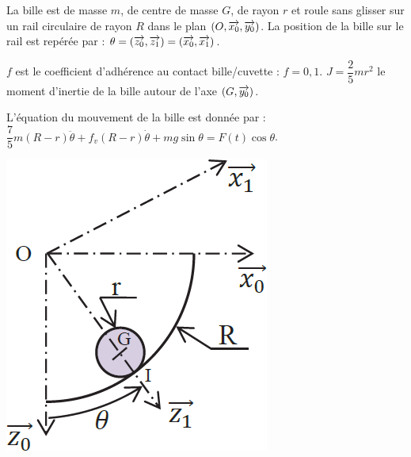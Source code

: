 \documentclass[10pt,fleqn]{article} %
\begin{document}
\noindent\begin{minipage}[c]{.7\linewidth}

La bille  est de masse $m$, de centre de masse $G$, de rayon $r$ et 
roule sans glisser sur un rail circulaire de rayon $R$ dans
le plan $\left( O, \overrightarrow{x_0}, \overrightarrow{y_0}\right)$. La position de la bille sur le rail est repérée par :
$\theta=\left(\overrightarrow{z_0},\overrightarrow{z_1}\right)=\left(\overrightarrow{x_0},\overrightarrow{x_1}\right)$.

$f$ est le coefficient d’adhérence au contact bille/cuvette : $f=0,1$. $J=\dfrac{2}{5}mr^2$ le moment d'inertie de la bille autour de l'axe $\left(G,\overrightarrow{{y_0}}\right)$.



L'équation du mouvement de la bille est donnée par :
 $\dfrac{7}{5} m\left(R-r \right)\ddot{\theta} + f_v \left(R-r \right)\dot{\theta} + mg \sin \theta = F(t) \cos \theta$.%


\end{minipage} \hfill
\begin{minipage}[c]{.25\linewidth}
\begin{center}
\includegraphics[width=\linewidth]{images/ccp_05}
\end{center}
\end{minipage} 
\end{document}
